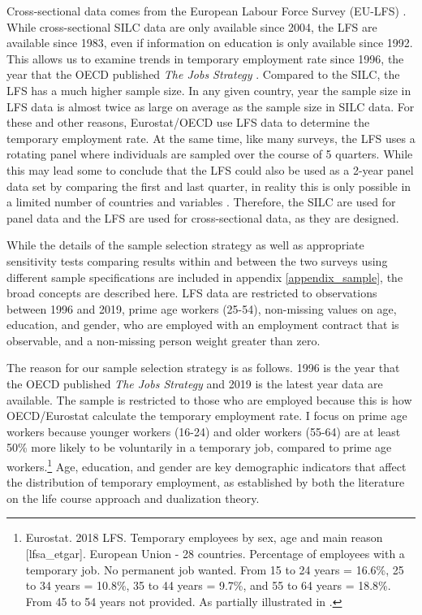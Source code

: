 \documentclass[12pt]{article}
\begin{document}
Cross-sectional data comes from the European Labour Force Survey (EU-LFS) \citep{eu_lfs}.  While cross-sectional SILC data are only available since 2004, the LFS are available since 1983, even if information on education is only available since 1992.  This allows us to examine trends in temporary employment rate since 1996, the year that the OECD published \emph{The Jobs Strategy} \citeyearpar{oecd_1996}.  Compared to the SILC, the LFS has a much higher sample size.  In any given country, year the sample size in LFS data is almost twice as large on average as the sample size in SILC data.  For these and other reasons, Eurostat/OECD use LFS data to determine the temporary employment rate.  At the same time, like many surveys, the LFS uses a rotating panel where individuals are sampled over the course of 5 quarters.  While this may lead some to conclude that the LFS could also be used as a 2-year panel data set by comparing the first and last quarter, in reality this is only possible in a limited number of countries and variables \citep{mack_etal_2016}.  Therefore, the SILC are used for panel data and the LFS are used for cross-sectional data, as they are designed.

While the details of the sample selection strategy as well as appropriate sensitivity tests comparing results within and between the two surveys using different sample specifications are included in appendix \ref{appendix_sample}, the broad concepts are described here.  LFS data are restricted to observations between 1996 and 2019, prime age workers (25-54), non-missing values on age, education, and gender, who are employed with an employment contract that is observable, and a non-missing person weight greater than zero.  

The reason for our sample selection strategy is as follows. 1996 is the year that the OECD published \emph{The Jobs Strategy} \citeyearpar{oecd_1996} and 2019 is the latest year data are available.  The sample is restricted to those who are employed because this is how OECD/Eurostat calculate the temporary employment rate.  I focus on prime age workers because younger workers (16-24) and older workers (55-64) are at least 50\% more likely to be voluntarily in a temporary job, compared to prime age workers.\footnote{Eurostat.  2018 LFS.  Temporary employees by sex, age and main reason [lfsa\_etgar].  European Union - 28 countries.  Percentage of employees with a temporary job.  No permanent job wanted.  From 15 to 24 years = 16.6\%, 25 to 34 years = 10.8\%, 35 to 44 years = 9.7\%, and 55 to 64 years = 18.8\%.  From 45 to 54 years not provided.  As partially illustrated in \citealp[fig. 22]{eurofound_2020}.}  Age, education, and gender are key demographic indicators that affect the distribution of temporary employment, as established by both the literature on the life course approach and dualization theory.  
\end{document}
